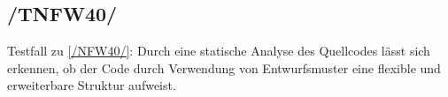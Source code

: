 \subsection*{/TNFW40/}

\label{/TNFW40/} Testfall zu \ref{/NFW40/}: Durch eine \gls{statische Analyse} des \Gls{Quellcode}s lässt sich erkennen, ob der Code durch Verwendung von \Gls{Entwurfsmuster} eine flexible und erweiterbare Struktur aufweist.
